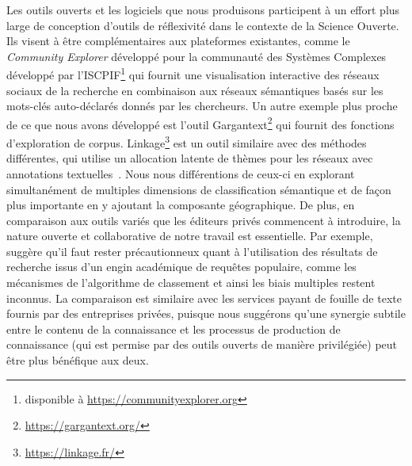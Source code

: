 {Les outils ouverts et les logiciels que nous produisons participent à un effort plus large de conception d'outils de réflexivité dans le contexte de la Science Ouverte. Ils visent à être complémentaires aux plateformes existantes, comme le \textit{Community Explorer} développé pour la communauté des Systèmes Complexes développé par l'ISCPIF\footnote{disponible à \url{https://communityexplorer.org}} qui fournit une visualisation interactive des réseaux sociaux de la recherche en combinaison aux réseaux sémantiques basés sur les mots-clés auto-déclarés donnés par les chercheurs. Un autre exemple plus proche de ce que nous avons développé est l'outil Gargantext\footnote{\url{https://gargantext.org/}} qui fournit des fonctions d'exploration de corpus. Linkage\footnote{\url{https://linkage.fr/}} est un outil similaire avec des méthodes différentes, qui utilise un allocation latente de thèmes pour les réseaux avec annotations textuelles~\citep{bouveyron2016stochastic}. Nous nous différentions de ceux-ci en explorant simultanément de multiples dimensions de classification sémantique et de façon plus importante en y ajoutant la composante géographique. De plus, en comparaison aux outils variés que les éditeurs privés commencent à introduire, la nature ouverte et collaborative de notre travail est essentielle. Par exemple, \cite{bohannon2014scientific} suggère qu'il faut rester précautionneux quant à l'utilisation des résultats de recherche issus d'un engin académique de requêtes populaire, comme les mécanismes de l'algorithme de classement et ainsi les biais multiples restent inconnus. La comparaison est similaire avec les services payant de fouille de texte fournis par des entreprises privées, puisque nous suggérons qu'une synergie subtile entre le contenu de la connaissance et les processus de production de connaissance (qui est permise par des outils ouverts de manière privilégiée) peut être plus bénéfique aux deux.
}









\stars





